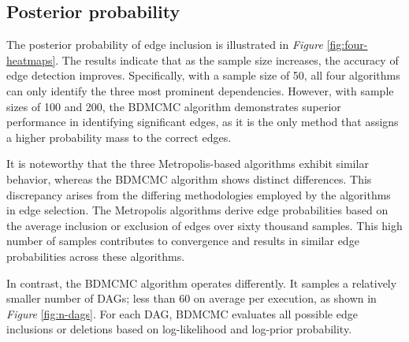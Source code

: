 \documentclass{report}
\begin{document}
\subsection{Posterior probability}

The posterior probability of edge inclusion is illustrated in \textit{Figure} \ref{fig:four-heatmaps}. The results indicate that as the sample size increases, the accuracy of edge detection improves. Specifically, with a sample size of 50, all four algorithms can only identify the three most prominent dependencies. However, with sample sizes of 100 and 200, the BDMCMC algorithm demonstrates superior performance in identifying significant edges, as it is the only method that assigns a higher probability mass to the correct edges.

It is noteworthy that the three Metropolis-based algorithms exhibit similar behavior, whereas the BDMCMC algorithm shows distinct differences. This discrepancy arises from the differing methodologies employed by the algorithms in edge selection. The Metropolis algorithms derive edge probabilities based on the average inclusion or exclusion of edges over sixty thousand samples. This high number of samples contributes to convergence and results in similar edge probabilities across these algorithms.

In contrast, the BDMCMC algorithm operates differently. It samples a relatively smaller number of DAGs; less than 60 on average per execution, as shown in \textit{Figure} \ref{fig:n-dags}. For each DAG, BDMCMC evaluates all possible edge inclusions or deletions based on log-likelihood and log-prior probability.
\end{document}
